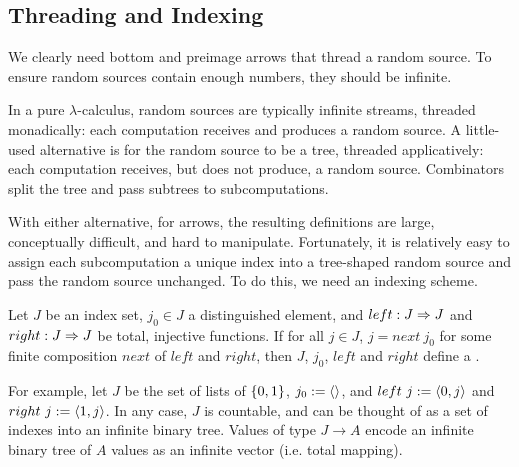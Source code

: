 \documentclass{llncs}
\begin{document}
\subsection{Threading and Indexing}
\label{sec:threading-and-indexing}

We clearly need bottom and preimage arrows that thread a random source.
To ensure random sources contain enough numbers, they should be infinite.

In a pure $\lambda$-calculus, random sources are typically infinite streams, threaded monadically: each computation receives and produces a random source.
A little-used alternative is for the random source to be a tree, threaded applicatively: each computation receives, but does not produce, a random source.
Combinators split the tree and pass subtrees to subcomputations.

With either alternative, for arrows, the resulting definitions are large, conceptually difficult, and hard to manipulate.
Fortunately, it is relatively easy to assign each subcomputation a unique index into a tree-shaped random source and pass the random source unchanged.
To do this, we need an indexing scheme.

\begin{definition}
Let $J$ be an index set, $j_0 \in J$ a distinguished element, and $left : J \Rightarrow J$ and $right : J \Rightarrow J$ be total, injective functions. If for all $j \in J$, $j = next~j_0$ for some finite composition $next$ of $left$ and $right$, then $J$, $j_0$, $left$ and $right$ define a .
\end{definition}

For example, let $J$ be the set of lists of $\{{0,1}\}$, $j_0 := \langle{}\rangle$, and $left~j := \langle{0,j}\rangle$ and $right~j := \langle{1,j}\rangle$.
In any case, $J$ is countable, and can be thought of as a set of indexes into an infinite binary tree.
Values of type $J \to A$ encode an infinite binary tree of $A$ values as an infinite vector (i.e. total mapping).
\end{document}
